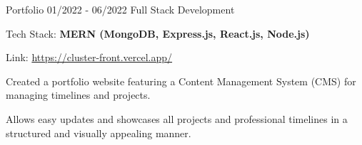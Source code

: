 \begin{cventries}
\cventrynew
  {Portfolio} %
  {01/2022 - 06/2022 } %
  {Full Stack Development} %
  {} %
  {
    \begin{cvitems}
      \item {Tech Stack: {\bf MERN (MongoDB, Express.js, React.js, Node.js)}}
      \item {Link: \href{https://cluster-front.vercel.app/}{https://cluster-front.vercel.app/}}
      \item {Created a portfolio website featuring a Content Management System (CMS) for managing timelines and projects.}
      \item {Allows easy updates and showcases all projects and professional timelines in a structured and visually appealing manner.}
    \end{cvitems}
  }





\end{cventries}
